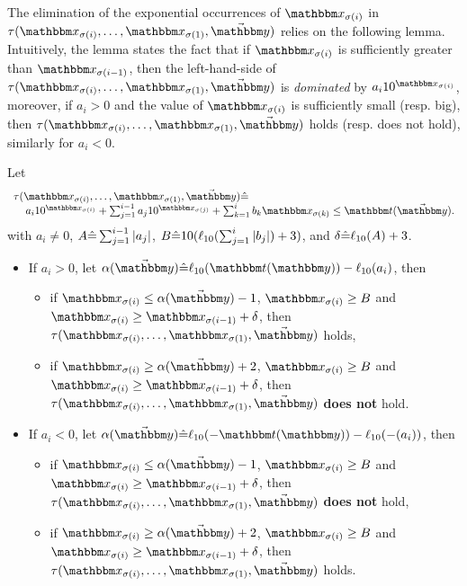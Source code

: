 The elimination of the exponential occurrences of $\ivarx_{\sigma(i)}$ in $\tau(\ivarx_{\sigma(i)}, \ldots, \ivarx_{\sigma(1)}, \vec{\ivary})$ relies on the following lemma. Intuitively, the lemma states the fact that if $\ivarx_{\sigma(i)}$ is sufficiently greater than $\ivarx_{\sigma(i-1)}$, then the left-hand-side of $\tau(\ivarx_{\sigma(i)}, \ldots, \ivarx_{\sigma(1)}, \vec{\ivary})$ is \emph{dominated} by $a_i10^{\ivarx_{\sigma(i)}}$, moreover, if $a_i > 0$ and the value of $\ivarx_{\sigma(i)}$ is sufficiently small (resp. big), then $\tau(\ivarx_{\sigma(i)}, \ldots, \ivarx_{\sigma(1)}, \vec{\ivary})$ holds (resp. does not hold), similarly for $a_i < 0$.

\begin{lemma} \label{lem:exp-ineq}
Let  
%
$$
\begin{array}{l}
\tau(\ivarx_{\sigma(i)}, \ldots, \ivarx_{\sigma(1)}, \vec{\ivary}) \Def  \\
\hspace{4mm} 
a_i 10^{\ivarx_{\sigma(i)}}+\sum_{j=1}^{i-1} a_j 10^{\ivarx_{\sigma(j)}} + \sum_{k=1}^{i}b_k \ivarx_{\sigma(k)} \le \iterm(\vec{\ivary}).
\end{array}
$$
%
with $a_i \neq 0$, $A\hat{=} \sum_{j=1}^{i-1}|a_j|$, 
$B \hat{=} 10(\ell_{10}(\sum_{j=1}^{i}|b_j|)+3)$,
and $\delta\hat{=}  \ell_{10}(A)+3$. 
\begin{itemize}
    \item If $a_i > 0$, let $\alpha(\vec{\ivary}) \Def \ell_{10}(\iterm(\ivary))- \ell_{10}(a_i)$, then 
    \begin{itemize}
        \item if $\ivarx_{\sigma(i)} \le \alpha(\vec{\ivary})  -1$, $\ivarx_{\sigma(i)} \ge B$ and $\ivarx_{\sigma(i)} \ge \ivarx_{\sigma(i-1)} +\delta $, then $\tau(\ivarx_{\sigma(i)}, \ldots, \ivarx_{\sigma(1)}, \vec{\ivary})$ holds,
        \item if $\ivarx_{\sigma(i)} \ge \alpha(\vec{\ivary})  +2$, $\ivarx_{\sigma(i)} \ge B$ and $\ivarx_{\sigma(i)}  \ge \ivarx_{\sigma(i-1)} +\delta$, then $\tau(\ivarx_{\sigma(i)}, \ldots, \ivarx_{\sigma(1)}, \vec{\ivary})$ \textbf{does not} hold.
    \end{itemize}
    \item If $a_i < 0$, let $\alpha(\vec{\ivary})  \Def \ell_{10}(-\iterm(\ivary))- \ell_{10}(-(a_i))$, then 
    \begin{itemize}
        \item if $\ivarx_{\sigma(i)} \le \alpha(\vec{\ivary})  -1$, $\ivarx_{\sigma(i)} \ge B$ and $\ivarx_{\sigma(i)} \ge \ivarx_{\sigma(i-1)} +\delta $, then $\tau(\ivarx_{\sigma(i)}, \ldots, \ivarx_{\sigma(1)}, \vec{\ivary})$ \textbf{does not} hold,
        \item if $\ivarx_{\sigma(i)} \ge \alpha(\vec{\ivary})  +2$, $\ivarx_{\sigma(i)} \ge B$ and $\ivarx_{\sigma(i)} \ge \ivarx_{\sigma(i-1)} +\delta $, then $\tau(\ivarx_{\sigma(i)}, \ldots, \ivarx_{\sigma(1)}, \vec{\ivary})$ holds.
    \end{itemize}
\end{itemize}
\end{lemma}

